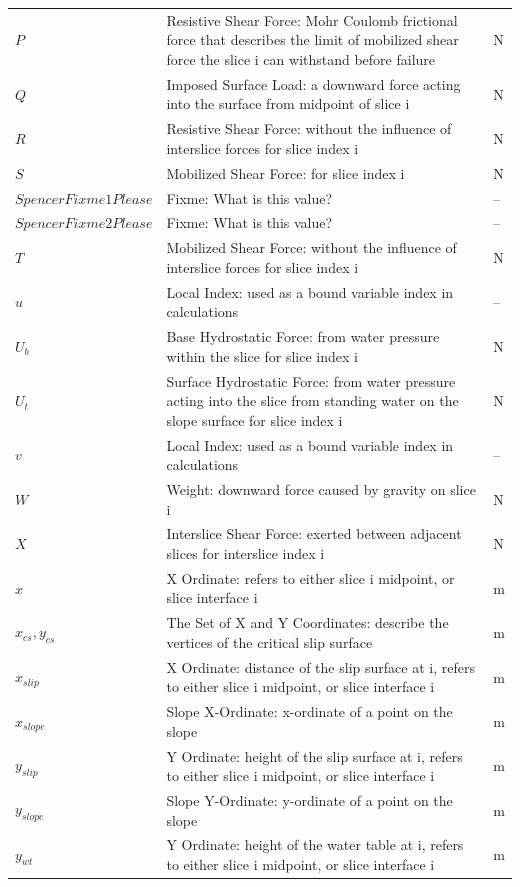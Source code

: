 \documentclass[12pt]{article}
\begin{document}
\begin{longtabu}{l X[l] l}
$P$ & Resistive Shear Force: Mohr Coulomb frictional force that describes the limit of mobilized shear force the slice i can withstand before failure & N
\\
$Q$ & Imposed Surface Load: a downward force acting into the surface from midpoint of slice i & N
\\
$R$ & Resistive Shear Force: without the influence of interslice forces for slice index i & N
\\
$S$ & Mobilized Shear Force: for slice index i & N
\\
$SpencerFixme1Please$ & Fixme: What is this value? & --
\\
$SpencerFixme2Please$ & Fixme: What is this value? & --
\\
$T$ & Mobilized Shear Force: without the influence of interslice forces for slice index i & N
\\
$u$ & Local Index: used as a bound variable index in calculations & --
\\
${U_{b}}$ & Base Hydrostatic Force: from water pressure within the slice for slice index i & N
\\
${U_{t}}$ & Surface Hydrostatic Force: from water pressure acting into the slice from standing water on the slope surface for slice index i & N
\\
$v$ & Local Index: used as a bound variable index in calculations & --
\\
$W$ & Weight: downward force caused by gravity on slice i & N
\\
$X$ & Interslice Shear Force: exerted between adjacent slices for interslice index i & N
\\
$x$ & X Ordinate: refers to either slice i midpoint, or slice interface i & m
\\
${x_{cs}},{y_{cs}}$ & The Set of X and Y Coordinates: describe the vertices of the critical slip surface & m
\\
${x_{slip}}$ & X Ordinate: distance of the slip surface at i, refers to either slice i midpoint, or slice interface i & m
\\
${x_{slope}}$ & Slope X-Ordinate: x-ordinate of a point on the slope & m
\\
${y_{slip}}$ & Y Ordinate: height of the slip surface at i, refers to either slice i midpoint, or slice interface i & m
\\
${y_{slope}}$ & Slope Y-Ordinate: y-ordinate of a point on the slope & m
\\
${y_{wt}}$ & Y Ordinate: height of the water table at i, refers to either slice i midpoint, or slice interface i & m

\end{longtabu}
\end{document}
